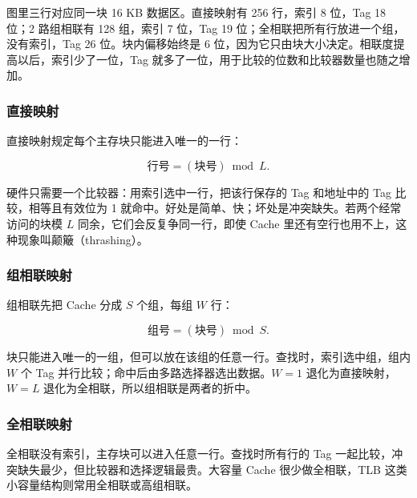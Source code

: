 图里三行对应同一块 16 KB 数据区。直接映射有 256 行，索引 8 位，Tag 18 位；2 路组相联有 128 组，索引 7 位，Tag 19 位；全相联把所有行放进一个组，没有索引，Tag 26 位。块内偏移始终是 6 位，因为它只由块大小决定。相联度提高以后，索引少了一位，Tag 就多了一位，用于比较的位数和比较器数量也随之增加。

\subsubsection*{直接映射}

直接映射规定每个主存块只能进入唯一的一行：

\[
\text{行号}=(\text{块号}) \bmod L .
\]

硬件只需要一个比较器：用索引选中一行，把该行保存的 Tag 和地址中的 Tag 比较，相等且有效位为 1 就命中。好处是简单、快；坏处是冲突缺失。若两个经常访问的块模 \(L\) 同余，它们会反复争同一行，即使 Cache 里还有空行也用不上，这种现象叫颠簸（thrashing）。

\subsubsection*{组相联映射}

组相联先把 Cache 分成 \(S\) 个组，每组 \(W\) 行：

\[
\text{组号}=(\text{块号}) \bmod S .
\]

块只能进入唯一的一组，但可以放在该组的任意一行。查找时，索引选中组，组内 \(W\) 个 Tag 并行比较；命中后由多路选择器选出数据。\(W=1\) 退化为直接映射，\(W=L\) 退化为全相联，所以组相联是两者的折中。

\subsubsection*{全相联映射}

全相联没有索引，主存块可以进入任意一行。查找时所有行的 Tag 一起比较，冲突缺失最少，但比较器和选择逻辑最贵。大容量 Cache 很少做全相联，TLB 这类小容量结构则常用全相联或高组相联。

